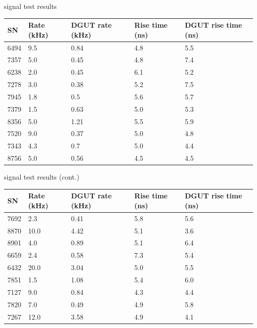 \documentclass{beamer}
\begin{document}
\begin{frame}{signal test results}
	\setlength{\tabcolsep}{2pt}
	\small
	\begin{center}
	\begin{tabular}{|l|p{1.2cm}|p{1.9cm}|p{1.5cm}|p{1.7cm}|}
		\hline
		\textbf{SN}&\textbf{Rate (kHz)}&\textbf{DGUT rate (kHz)}&\textbf{Rise time (ns)}&
		\textbf{DGUT rise time (ns)}\\
		\hline
		\hline
		6494&9.5&0.84&4.8&5.5\\
		7357&5.0&0.45&4.8&7.4\\
		6238&2.0&0.45&6.1&5.2\\
		7278&3.0&0.38&5.2&7.5\\
		7945&1.8&0.5&5.6&5.7\\
		7379&1.5&0.63&5.0&5.3\\
		8356&5.0&1.21&5.5&5.9\\
		7520&9.0&0.37&5.0&4.8\\
		7343&4.3&0.7&5.0&4.4\\
		8756&5.0&0.56&4.5&4.5\\
		\hline
	\end{tabular}
	\end{center}
\end{frame}

\begin{frame}{signal test results (cont.)}
	\setlength{\tabcolsep}{2pt}
	\small
	\begin{center}
	\begin{tabular}{|l|p{1.2cm}|p{1.9cm}|p{1.5cm}|p{1.7cm}|}
		\hline
		\textbf{SN}&\textbf{Rate (kHz)}&\textbf{DGUT rate (kHz)}&\textbf{Rise time (ns)}&
		\textbf{DGUT rise time (ns)}\\
		\hline
		\hline
		7692&2.3&0.41&5.8&5.6\\
		8870&10.0&4.42&5.1&3.6\\
		8901&4.0&0.89&5.1&6.4\\
		6659&2.4&0.58&7.3&5.4\\
		6432&20.0&3.04&5.0&5.5\\
		7851&1.5&1.08&5.4&6.0\\
		7127&9.0&0.84&4.3&4.4\\
		7820&7.0&0.49&4.9&5.8\\
		7267&12.0&3.58&4.9&4.1\\
		\hline
	\end{tabular}
	\end{center}
\end{frame}
\end{document}
